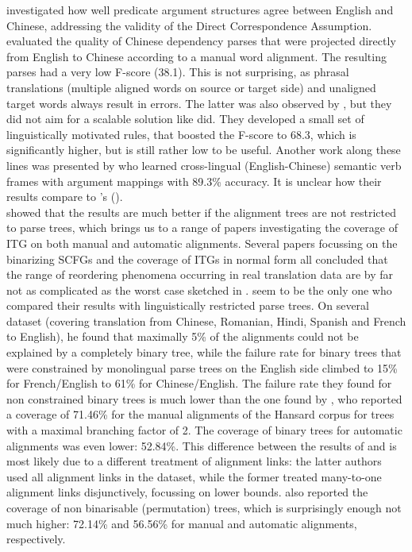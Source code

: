 \documentclass{report}
\theoremstyle{definition}
\theoremstyle{plain}
\def\citepos#1{\citeauthor{#1}'s (\citeyear{#1})}
\begin{document}
\cite{hwa2002evaluating} investigated how well predicate argument structures agree between English and Chinese, addressing the validity of the Direct Correspondence Assumption. \citeauthor{hwa2002evaluating} evaluated the quality of Chinese dependency parses that were projected directly from English to Chinese according to a manual word alignment. The resulting parses had a very low F-score (38.1). This is not surprising, as phrasal translations (multiple aligned words on source or target side) and unaligned target words always result in errors. The latter was also observed by \cite{hwa2002evaluating}, but they did not aim for a scalable solution like \cite{fox2002phrasal} did. They developed a small set of linguistically motivated rules, that boosted the F-score to 68.3, which is significantly higher, but is still rather low to be useful. Another work along these lines was presented by \cite{fung2006automatic} who learned cross-lingual (English-Chinese) semantic verb frames with argument mappings with 89.3\% accuracy. It is unclear how their results compare to \citepos{hwa2002evaluating}.\\
\cite{wellington2006empirical} showed that the results are much better if the alignment trees are not restricted to parse trees, which brings us to a range of papers investigating the coverage of ITG on both manual and automatic alignments. Several papers focussing on the binarizing SCFGs \citep{zhang2006synchronous,huang2009binarization} and the coverage of ITGs in normal form \citep{sogaard2009empirical1,sogaard2009empirical2,sogaard2010can} all concluded that the range of reordering phenomena occurring in real translation data are by far not as complicated as the worst case sketched in \cite{satta2005some}. \cite{wellington2006empirical} seem to be the only one who compared their results with linguistically restricted parse trees. On several dataset (covering translation from Chinese, Romanian, Hindi, Spanish and French to English), he found that maximally 5\% of the alignments could not be explained by a completely binary tree, while the failure rate for binary trees that were constrained by monolingual parse trees on the English side climbed to 15\% for French/English to 61\% for Chinese/English. The failure rate they found for non constrained binary trees is much lower than the one found by \cite{simaan2013hats}, who reported a coverage of 71.46\% for the manual alignments of the Hansard corpus for trees with a maximal branching factor of 2. The coverage of binary trees for automatic alignments was even lower: 52.84\%. This difference between the results of \cite{wellington2006empirical} and \cite{simaan2013hats} is most likely due to a different treatment of alignment links: the latter authors used all alignment links in the dataset, while the former treated many-to-one alignment links disjunctively, focussing on lower bounds. \cite{simaan2013hats} also reported the coverage of non binarisable (permutation) trees, which is surprisingly enough not much higher: 72.14\% and 56.56\% for manual and automatic alignments, respectively.
\end{document}
